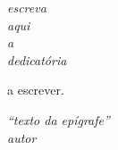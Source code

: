 \documentclass[
	12pt,				%
	openright,			%
	oneside,			%
	a4paper,			%
	chapter=TITLE,		%
	english,			%
	french,				%
	spanish,			%
	brazil				%
	]{abntex2}
\theoremstyle{definition}
\renewcommand{\pretextual}{
  \pagenumbering{roman} %
  \aliaspagestyle{chapter}{estilo_pretextual}%
  \pagestyle{estilo_pretextual}
  \aliaspagestyle{cleared}{empty}
  \aliaspagestyle{part}{estilo_pretextual}
}
\begin{document}
\frenchspacing 


\imprimircapa

\imprimirfolhaderosto
%     
\newpage
\begin{fichacatalografica}
	\imprimirfichacatalografica
\end{fichacatalografica}

% 
\begin{folhadeaprovacao}
	\ufpaPaginaDeAprovacao
\end{folhadeaprovacao}

\begin{dedicatoria}
   \vspace*{\fill}
   \noindent
   \begin{flushright}
      \textit{escreva}\\
      \textit{aqui}\\
      \textit{a}\\
      \textit{dedicatória}
   \end{flushright}
\end{dedicatoria}

\begin{agradecimentos}
a escrever.
\end{agradecimentos}

\begin{epigrafe}
    \vspace*{\fill}
	\begin{flushright}
		\textit{``texto da epígrafe''\\
		autor}
	\end{flushright}
\end{epigrafe}
\end{document}
